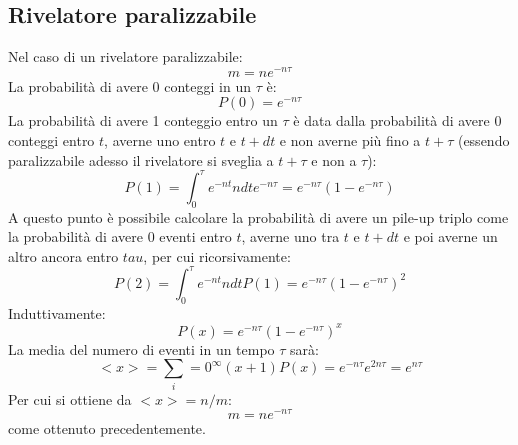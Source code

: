 \subsection{Rivelatore paralizzabile}
Nel caso di un rivelatore paralizzabile:
\begin{equation*}
m = n e^{-n\tau}
\end{equation*}
La probabilit\`a di avere 0 conteggi in un $\tau$ \`e:
\begin{equation*}
P(0) = e^{-n\tau}
\end{equation*}
La probabilit\`a di avere 1 conteggio entro un $\tau$ \`e data dalla probabilit\`a di avere 0 conteggi entro $t$, averne uno entro $t$ e $t+dt$ e non averne pi\`u fino a $t+\tau$ (essendo paralizzabile adesso il rivelatore si sveglia a $t+\tau$ e non a $\tau$):
\begin{equation*}
P(1) = \int_0^{\tau} e^{-nt} n dt e^{-n\tau} = e^{-n\tau}(1-e^{-n\tau})
\end{equation*}
A questo punto \`e possibile calcolare la probabilit\`a di avere un pile-up triplo come la probabilit\`a di avere 0 eventi entro $t$, averne uno tra $t$ e $t+dt$ e poi averne un altro ancora entro $tau$, per cui ricorsivamente:
\begin{equation*}
P(2) = \int_0^{\tau} e^{-nt} n dt P(1) = e^{-n\tau} (1- e^{-n\tau} )^2
\end{equation*}
Induttivamente:
\begin{equation*}
P(x) =  e^{-n\tau} (1- e^{-n\tau} )^x
\end{equation*}
La media del numero di eventi in un tempo $\tau$ sar\`a:
\begin{equation*}
<x> = \sum_i=0^{\infty} (x+1) P(x) = e^{-n\tau}e^{2n\tau} = e^{n\tau}
\end{equation*}
Per cui si ottiene da $<x>=n/m$:
\begin{equation*}
m = n e^{-n\tau}
\end{equation*}
come ottenuto precedentemente.
